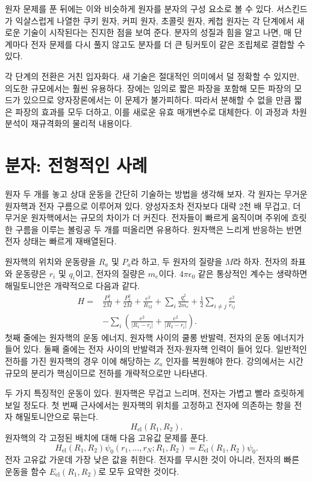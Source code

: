 원자 문제를 푼 뒤에는 이와 비슷하게 원자를 분자의 구성 요소로 볼 수 있다. 서스킨드가 익살스럽게 나열한 쿠키 원자, 커피 원자, 초콜릿 원자, 케첩 원자는 각 단계에서 새로운 기술이 시작된다는 진지한 점을 보여 준다. 분자의 성질과 힘을 알고 나면, 매 단계마다 전자 문제를 다시 풀지 않고도 분자를 더 큰 팅커토이 같은 조립체로 결합할 수 있다.

각 단계의 전환은 거친 입자화다. 새 기술은 절대적인 의미에서 덜 정확할 수 있지만, 의도한 규모에서는 훨씬 유용하다. 장에는 임의로 짧은 파장을 포함해 모든 파장의 모드가 있으므로 양자장론에서는 이 문제가 불가피하다. 따라서 분해할 수 없을 만큼 짧은 파장의 효과를 모두 더하고, 이를 새로운 유효 매개변수로 대체한다. 이 과정과 차원 분석이 재규격화의 물리적 내용이다.

\section{분자: 전형적인 사례}

원자 두 개를 놓고 상대 운동을 간단히 기술하는 방법을 생각해 보자. 각 원자는 무거운 원자핵과 전자 구름으로 이루어져 있다. 양성자조차 전자보다 대략 2천 배 무겁고, 더 무거운 원자핵에서는 규모의 차이가 더 커진다. 전자들이 빠르게 움직이며 주위에 흐릿한 구름을 이루는 볼링공 두 개를 떠올리면 유용하다. 원자핵은 느리게 반응하는 반면 전자 상태는 빠르게 재배열된다.

원자핵의 위치와 운동량을 \(R_a\) 및 \(P_a\)라 하고, 두 원자의 질량을 \(M\)라 하자. 전자의 좌표와 운동량은 \(r_i\) 및 \(q_i\)이고, 전자의 질량은 \(m_e\)이다. \(4\pi\epsilon_0\) 같은 통상적인 계수는 생략하면 해밀토니안은 개략적으로 다음과 같다.
\begin{align}
H={}&
\frac{P_1^2}{2M}+\frac{P_2^2}{2M}
+\frac{e^2}{R_{12}}
+\sum_i\frac{q_i^2}{2m_e}
+\frac12\sum_{i\ne j}\frac{e^2}{r_{ij}}
\nonumber\\
&-\sum_i\left(
\frac{e^2}{|R_1-r_i|}
+\frac{e^2}{|R_2-r_i|}
\right).
\label{eq:molecular-hamiltonian}
\end{align}
첫째 줄에는 원자핵의 운동 에너지, 원자핵 사이의 쿨롱 반발력, 전자의 운동 에너지가 들어 있다. 둘째 줄에는 전자 사이의 반발력과 전자-원자핵 인력이 들어 있다. 일반적인 전하를 가진 원자핵의 경우 이에 해당하는 \(Z_a\) 인자를 복원해야 한다. 강의에서는 시간 규모의 분리가 핵심이므로 전하를 개략적으로만 나타낸다.

두 가지 특징적인 운동이 있다. 원자핵은 무겁고 느리며, 전자는 가볍고 빨라 흐릿하게 보일 정도다. 첫 번째 근사에서는 원자핵의 위치를 고정하고 전자에 의존하는 항을 전자 해밀토니안으로 묶는다.
\begin{equation}
H_{\mathrm{el}}(R_1,R_2).
\end{equation}
원자핵의 각 고정된 배치에 대해 다음 고유값 문제를 푼다.
\begin{equation}
H_{\mathrm{el}}(R_1,R_2)
\psi_0(r_1,\ldots,r_N;R_1,R_2)
=
E_{\mathrm{el}}(R_1,R_2)\psi_0.
\label{eq:electronic-ground-state}
\end{equation}
전자 고유값 가운데 가장 낮은 값을 취한다. 전자를 무시한 것이 아니라, 전자의 빠른 운동을 함수 \(E_{\mathrm{el}}(R_1,R_2)\)로 모두 요약한 것이다.

